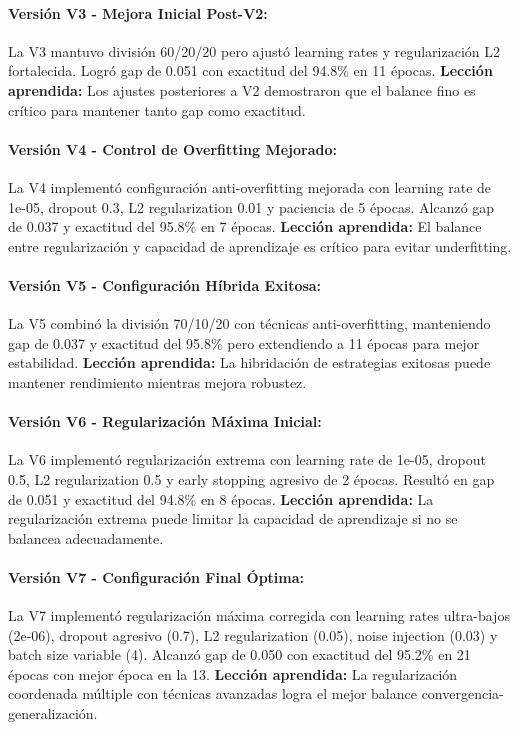 \paragraph{Versión V3 - Mejora Inicial Post-V2:}
La V3 mantuvo división 60/20/20 pero ajustó learning rates y regularización L2 fortalecida. Logró gap de 0.051 con exactitud del 94.8\% en 11 épocas. \textbf{Lección aprendida:} Los ajustes posteriores a V2 demostraron que el balance fino es crítico para mantener tanto gap como exactitud.

\paragraph{Versión V4 - Control de Overfitting Mejorado:}
La V4 implementó configuración anti-overfitting mejorada con learning rate de 1e-05, dropout 0.3, L2 regularization 0.01 y paciencia de 5 épocas. Alcanzó gap de 0.037 y exactitud del 95.8\% en 7 épocas. \textbf{Lección aprendida:} El balance entre regularización y capacidad de aprendizaje es crítico para evitar underfitting.

\paragraph{Versión V5 - Configuración Híbrida Exitosa:}
La V5 combinó la división 70/10/20 con técnicas anti-overfitting, manteniendo gap de 0.037 y exactitud del 95.8\% pero extendiendo a 11 épocas para mejor estabilidad. \textbf{Lección aprendida:} La hibridación de estrategias exitosas puede mantener rendimiento mientras mejora robustez.

\paragraph{Versión V6 - Regularización Máxima Inicial:}
La V6 implementó regularización extrema con learning rate de 1e-05, dropout 0.5, L2 regularization 0.5 y early stopping agresivo de 2 épocas. Resultó en gap de 0.051 y exactitud del 94.8\% en 8 épocas. \textbf{Lección aprendida:} La regularización extrema puede limitar la capacidad de aprendizaje si no se balancea adecuadamente.

\paragraph{Versión V7 - Configuración Final Óptima:}
La V7 implementó regularización máxima corregida con learning rates ultra-bajos (2e-06), dropout agresivo (0.7), L2 regularization (0.05), noise injection (0.03) y batch size variable (4). Alcanzó gap de 0.050 con exactitud del 95.2\% en 21 épocas con mejor época en la 13. \textbf{Lección aprendida:} La regularización coordenada múltiple con técnicas avanzadas logra el mejor balance convergencia-generalización.

